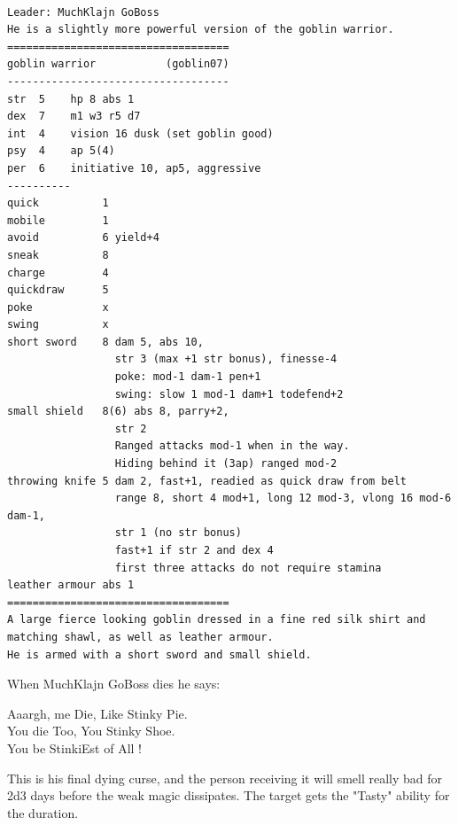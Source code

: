 \

\goodbreak \begin{samepage} \vsmall \begin{verbatim}
Leader: MuchKlajn GoBoss
He is a slightly more powerful version of the goblin warrior.
===================================
goblin warrior           (goblin07)
-----------------------------------
str  5    hp 8 abs 1
dex  7    m1 w3 r5 d7
int  4    vision 16 dusk (set goblin good)
psy  4    ap 5(4)
per  6    initiative 10, ap5, aggressive
----------
quick          1
mobile         1
avoid          6 yield+4
sneak          8
charge         4
quickdraw      5
poke           x
swing          x
short sword    8 dam 5, abs 10,
                 str 3 (max +1 str bonus), finesse-4
                 poke: mod-1 dam-1 pen+1
                 swing: slow 1 mod-1 dam+1 todefend+2
small shield   8(6) abs 8, parry+2,
                 str 2
                 Ranged attacks mod-1 when in the way.
                 Hiding behind it (3ap) ranged mod-2
throwing knife 5 dam 2, fast+1, readied as quick draw from belt
                 range 8, short 4 mod+1, long 12 mod-3, vlong 16 mod-6 dam-1,
                 str 1 (no str bonus)
                 fast+1 if str 2 and dex 4
                 first three attacks do not require stamina
leather armour abs 1
===================================
A large fierce looking goblin dressed in a fine red silk shirt and
matching shawl, as well as leather armour.
He is armed with a short sword and small shield.
\end{verbatim} \normalsize \end{samepage}

When MuchKlajn GoBoss dies he says:
\begin{readoutloud}
    Aaargh, me Die, Like Stinky Pie.\\
    You die Too, You Stinky Shoe.\\
    You be StinkiEst of All !
\end{readoutloud}
This is his final dying curse, and the person receiving it will smell
really bad for 2d3 days before the weak magic dissipates.
The target gets the "Tasty" ability for the duration.

\flushbottom
















